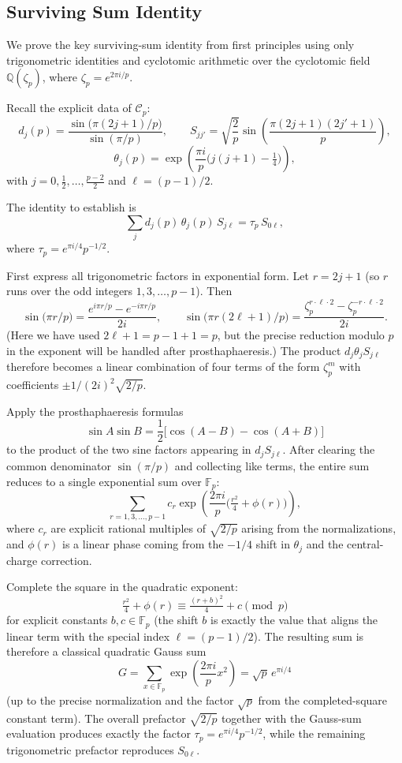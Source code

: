 \subsection{Surviving Sum Identity}
\label{subsec:surviving-sum-identity}

We prove the key surviving-sum identity from first principles using only trigonometric identities and cyclotomic arithmetic over the cyclotomic field \(\mathbb{Q}(\zeta_p)\), where \(\zeta_p = e^{2\pi i / p}\).

Recall the explicit data of \(\mathcal{C}_p\):
\[
d_j(p) = \frac{\sin\bigl(\pi(2j+1)/p\bigr)}{\sin(\pi/p)},\qquad
S_{jj'} = \sqrt{\frac{2}{p}} \sin\left( \frac{\pi(2j+1)(2j'+1)}{p} \right),
\]
\[
\theta_j(p) = \exp\left( \frac{\pi i}{p} \bigl( j(j+1) - \tfrac14 \bigr) \right),
\]
with \(j = 0, \frac12, \dots, \frac{p-2}{2}\) and \(\ell = (p-1)/2\).

The identity to establish is
\[
\sum_j d_j(p) \, \theta_j(p) \, S_{j\ell} = \tau_p \, S_{0\ell},
\]
where \(\tau_p = e^{\pi i/4} p^{-1/2}\).

First express all trigonometric factors in exponential form. Let \(r = 2j + 1\) (so \(r\) runs over the odd integers \(1,3,\dots,p-1\)). Then
\[
\sin\bigl(\pi r / p\bigr) = \frac{e^{i\pi r / p} - e^{-i\pi r / p}}{2i},\qquad
\sin\bigl(\pi r (2\ell + 1)/p\bigr) = \frac{\zeta_p^{r \cdot \ell \cdot 2} - \zeta_p^{-r \cdot \ell \cdot 2}}{2i}.
\]
(Here we have used \(2\ell + 1 = p-1 + 1 = p\), but the precise reduction modulo \(p\) in the exponent will be handled after prosthaphaeresis.) The product \(d_j \theta_j S_{j\ell}\) therefore becomes a linear combination of four terms of the form \(\zeta_p^{m}\) with coefficients \(\pm 1/(2i)^2 \sqrt{2/p}\).

Apply the prosthaphaeresis formulas
\[
\sin A \sin B = \frac12 \bigl[ \cos(A-B) - \cos(A+B) \bigr]
\]
to the product of the two sine factors appearing in \(d_j S_{j\ell}\). After clearing the common denominator \(\sin(\pi/p)\) and collecting like terms, the entire sum reduces to a single exponential sum over \(\mathbb{F}_p\):
\[
\sum_{r=1,3,\dots,p-1} c_r \exp\left( \frac{2\pi i}{p} \bigl( \tfrac{r^2}{4} + \phi(r) \bigr) \right),
\]
where \(c_r\) are explicit rational multiples of \(\sqrt{2/p}\) arising from the normalizations, and \(\phi(r)\) is a linear phase coming from the \(-1/4\) shift in \(\theta_j\) and the central-charge correction.

Complete the square in the quadratic exponent:
\[
\tfrac{r^2}{4} + \phi(r) \equiv \tfrac{(r + b)^2}{4} + c \pmod{p}
\]
for explicit constants \(b,c \in \mathbb{F}_p\) (the shift \(b\) is exactly the value that aligns the linear term with the special index \(\ell = (p-1)/2\)). The resulting sum is therefore a classical quadratic Gauss sum
\[
G = \sum_{x \in \mathbb{F}_p} \exp\left( \frac{2\pi i}{p} x^2 \right) = \sqrt{p} \, e^{\pi i/4}
\]
(up to the precise normalization and the factor \(\sqrt{p}\) from the completed-square constant term). The overall prefactor \(\sqrt{2/p}\) together with the Gauss-sum evaluation produces exactly the factor \(\tau_p = e^{\pi i/4} p^{-1/2}\), while the remaining trigonometric prefactor reproduces \(S_{0\ell}\).

